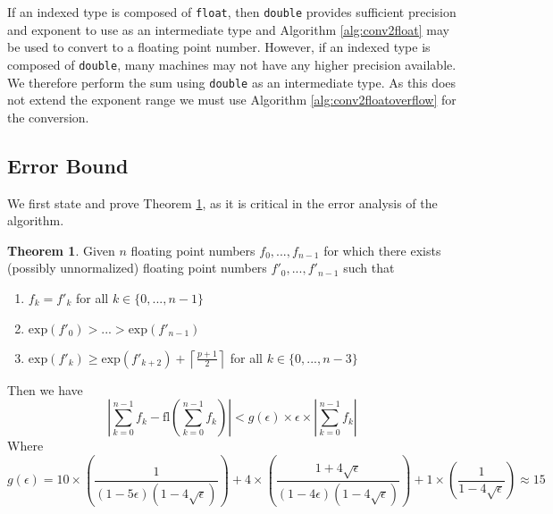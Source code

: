 \documentclass[12pt]{article}
\providecommand{\ceil}[1]{\left \lceil #1 \right \rceil }
\providecommand{\exp}{\ensuremath{\text{exp}}}
\providecommand{\fl}{\ensuremath{\text{fl}}}
\theoremstyle{definition}
\newtheorem{thm}{Theorem}[section]
\numberwithin{equation}{section}
\begin{document}
    If an indexed type is composed of \verb|float|, then \verb|double| provides sufficient precision and exponent to use as an intermediate type and Algorithm \ref{alg:conv2float} may be used to convert to a floating point number.
    However, if an indexed type is composed of \verb|double|, many machines may not have any higher precision available. We therefore perform the sum using \verb|double| as an intermediate type. As this does not extend the exponent range we must use Algorithm \ref{alg:conv2floatoverflow} for the conversion.

  \subsection{Error Bound}
    \label{sec:basicops_error}

    We first state and prove Theorem \ref{thm:mysortsum}, as it is critical in the error analysis of the algorithm.
    \begin{thm}
      Given $n$ floating point numbers $f_0, ..., f_{n - 1}$ for which there exists (possibly unnormalized) floating point numbers $f'_0, ..., f'_{n - 1}$ such that
      \begin{enumerate}
        \item $f_k = f'_k$ for all $k \in \{0, ..., n - 1\}$
        \item $\exp(f'_0) > ... > \exp(f'_{n - 1})$
        \item $\exp(f'_k) \geq \exp(f'_{k + 2}) + \ceil{\frac{p + 1}{2}}$ for all $k \in \{0, ..., n - 3\}$
      \end{enumerate}
      \label{thm:mysortsum}
      Then we have
      \begin{equation*}
        |\sum \limits_{k = 0}^{n - 1} f_k - \fl(\sum \limits_{k = 0}^{n - 1} f_k)| < g(\epsilon) \times \epsilon \times |\sum\limits_{k = 0}^{n - 1}f_k|
      \end{equation*}
      Where
      \begin{equation}
        g(\epsilon) = 10 \times (\frac{1}{(1 - 5 \epsilon)(1 - 4\sqrt\epsilon)}) + 4 \times (\frac{1 + 4 \sqrt\epsilon}{(1 - 4 \epsilon)(1 - 4 \sqrt\epsilon)}) + 1 \times (\frac{1}{1 - 4 \sqrt\epsilon}) \approx 15
        \label{eq:g}
      \end{equation}
    \end{thm}
\end{document}
